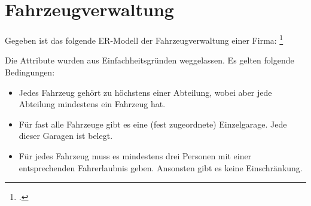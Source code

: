 \documentclass{lehramt-informatik-haupt}
\begin{document}
%

\section{Fahrzeugverwaltung}

Gegeben ist das folgende ER-Modell der Fahrzeugverwaltung einer Firma:
\footcite[Seite 2-3, Aufgabe 4: Fahrzeugverwaltung]{db:ab:1}


\noindent
Die Attribute wurden aus Einfachheitsgründen weggelassen. Es gelten
folgende Bedingungen:

\begin{itemize}

\item Jedes Fahrzeug gehört zu höchstens einer Abteilung, wobei aber
jede Abteilung mindestens ein Fahrzeug hat.

\item Für fast alle Fahrzeuge gibt es eine (fest zugeordnete)
Einzelgarage. Jede dieser Garagen ist belegt.

\item Für jedes Fahrzeug muss es mindestens drei Personen mit einer
entsprechenden Fahrerlaubnis geben. Ansonsten gibt es keine
Einschränkung.
\end{itemize}
\end{document}
